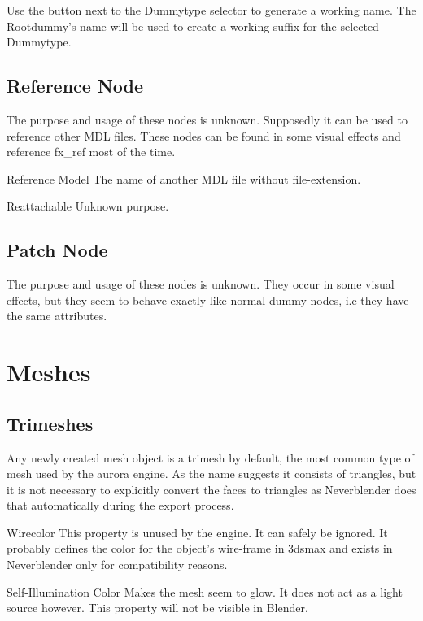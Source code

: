 Use the button next to the Dummytype selector to generate a
working name. The Rootdummy's name will be used to create a working
suffix for the selected Dummytype. \\

\subsection{Reference Node}
The purpose and usage of these nodes is unknown. Supposedly it can be used to
reference other MDL files. These nodes can be found in some visual effects and reference fx\_ref 
most of the time.

\begin{property}{Reference Model}
The name of another MDL file without file-extension.
\end{property}

\begin{property}{Reattachable}
Unknown purpose.
\end{property}

\subsection{Patch Node}
The purpose and usage of these nodes is unknown. They occur in some visual effects, but
they seem to behave exactly like normal dummy nodes, i.e they have the same
attributes.

\section{Meshes}

\subsection{Trimeshes}
Any newly created mesh object is a trimesh by default, the most common type of mesh 
used by the aurora engine. As the name suggests it consists of triangles, but it is 
not necessary to explicitly convert the faces to triangles as Neverblender does that 
automatically during the export process.

\begin{property}{Wirecolor}
This property is unused by the engine. It can safely be ignored. It probably defines the
color for the object's wire-frame in 3dsmax and exists in Neverblender only for 
compatibility reasons.
\end{property}

\begin{property}{Self-Illumination Color}
Makes the mesh seem to glow. It does not act as a light source however.
This property will not be visible in Blender.
\end{property}

